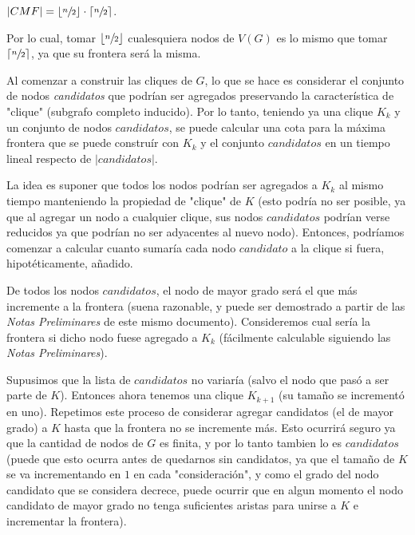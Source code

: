 \begin{description}
        \par $|CMF| = \lfloor\sfrac{n}{2}\rfloor \cdot \lceil\sfrac{n}{2}\rceil$.

        \par Por lo cual, tomar $\lfloor\sfrac{n}{2}\rfloor$ cualesquiera nodos de $V(G)$
            es lo mismo que tomar $\lceil\sfrac{n}{2}\rceil$, ya que su frontera ser\'a
            la misma.

    \item[M\'axima frontera de la rama\label{backtracking:poda:cota_frontera_max}]
        Al comenzar a construir las cliques de $G$,
        lo que se hace es considerar el conjunto de nodos \emph{candidatos} que podr\'ian
        ser agregados preservando la caracter\'istica de "clique" (subgrafo completo
        inducido). Por lo tanto, teniendo ya una clique $K_k$ y un conjunto de nodos
        $candidatos$, se puede calcular una cota para la m\'axima frontera que
        se puede constru\'ir con $K_k$ y el conjunto $candidatos$ en un tiempo
        lineal respecto de $|candidatos|$.

        \par La idea es suponer que todos los nodos podr\'ian ser agregados a $K_k$
            al mismo tiempo manteniendo la propiedad de "clique" de $K$ (esto podr\'ia
            no ser posible, ya que al agregar un nodo a cualquier clique, sus nodos
            $candidatos$ podr\'ian verse reducidos ya que podr\'ian no ser adyacentes
            al nuevo nodo). Entonces, podr\'iamos comenzar a calcular cuanto sumar\'ia
            cada nodo $candidato$ a la clique si fuera, hipot\'eticamente, a\~nadido.

        \par De todos los nodos $candidatos$, el nodo de mayor grado ser\'a el que m\'as
            incremente a la frontera (suena razonable, y puede ser demostrado a partir
            de las \emph{Notas Preliminares} de este mismo documento). Consideremos
            cual ser\'ia la frontera si dicho nodo fuese agregado a $K_k$ (f\'acilmente
            calculable siguiendo las \emph{Notas Preliminares}).

        \par Supusimos que la lista de $candidatos$ no variar\'ia (salvo el nodo que
            pas\'o a ser parte de $K$). Entonces ahora tenemos una clique $K_{k+1}$
            (su tama\~no se increment\'o en uno). Repetimos este proceso de considerar
            agregar candidatos (el de mayor grado) a $K$ hasta que la frontera no se
            incremente m\'as. Esto ocurrir\'a seguro ya que la cantidad de nodos de $G$
            es finita, y por lo tanto tambien lo es $candidatos$ (puede que esto ocurra
            antes de quedarnos sin candidatos, ya que el tama\~no de $K$ se va incrementando
            en $1$ en cada "consideraci\'on", y como el grado del nodo candidato que se
            considera decrece, puede ocurrir que en algun momento el nodo candidato de
            mayor grado no tenga suficientes aristas para unirse a $K$ e incrementar
            la frontera).


\end{description}
